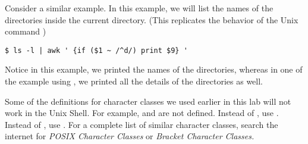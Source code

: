 Consider a similar example.
In this example, we will list the names of the directories inside the current directory.
(This replicates the behavior of the Unix command )

\begin{lstlisting}
$ ls -l | awk ' {if ($1 ~ /^d/) print $9} '
\end{lstlisting}

Notice in this example, we printed the names of the directories, whereas in one of the example using , we printed all the details of the directories as well.

\begin{warn}
Some of the definitions for character classes we used earlier in this lab will not work in the Unix Shell. For example, \li{\\w} and \li{\\d} are not defined. Instead of \li{\\w}, use \li{[[:alnum:]]}. Instead of \li{\\d}, use \li{[[:digit:]]}. For a complete list of similar character classes, search the internet for \emph{POSIX Character Classes} or \emph{Bracket Character Classes.}
\end{warn}

